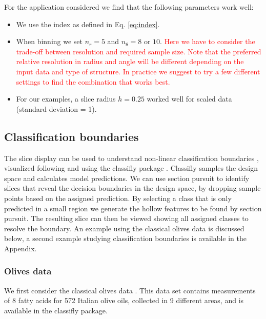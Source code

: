 \documentclass[]{interact}
\theoremstyle{plain}%
\theoremstyle{definition}
\theoremstyle{remark}
\def\tightlist{}
\begin{document}
For the application considered we find that the following parameters
work well:

\begin{itemize}
\tightlist
\item
  We use the index as defined in Eq. \ref{eq:index}.
\item
  When binning we set \(n_r=5\) and \(n_{\theta}=8\) or \(10\).
  \textcolor{red}{Here we have to consider the trade-off between resolution and required sample size. Note that the preferred relative resolution in radius and angle will be different depending on the input data and type of structure. In practice we suggest to try a few different settings to find the combination that works best.}
\item
  For our examples, a slice radius \(h=0.25\) worked well for scaled
  data (standard deviation = 1).
\end{itemize}

\hypertarget{classification-boundaries}{%
\subsection{Classification boundaries}\label{classification-boundaries}}

The slice display can be used to understand non-linear classification
boundaries \citep{laa2019slice}, visualized following \citet{sam.11271}
and using the classifly package \citep{classifly}. Classifly samples the
design space and calculates model predictions. We can use section
pursuit to identify slices that reveal the decision boundaries in the
design space, by dropping sample points based on the assigned
prediction. By selecting a class that is only predicted in a small
region we generate the hollow features to be found by section pursuit.
The resulting slice can then be viewed showing all assigned classes to
resolve the boundary. An example using the classical olives data is
discussed below, a second example studying classification boundaries is
available in the Appendix.

\hypertarget{sec:olives}{%
\subsubsection*{Olives data}\label{sec:olives}}

We first consider the classical olives data \citep{olives}. This data
set contains measurements of 8 fatty acids for 572 Italian olive oils,
collected in 9 different areas, and is available in the classifly
package.
\end{document}

